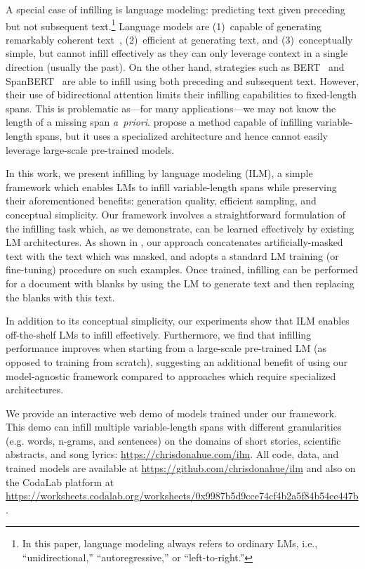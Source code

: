 A special case of infilling is language modeling: 
predicting text given preceding but not subsequent text.\footnote{In this paper, language modeling always refers to ordinary LMs, i.e., ``unidirectional,'' ``autoregressive,'' or ``left-to-right.''}
Language models are 
(1)~capable of generating remarkably coherent text~\citep{zellers2019defending,see2019massively},
(2)~efficient at generating text, 
and 
(3)~conceptually simple, 
but cannot infill effectively as they can only leverage context in a single direction (usually the past).
On the other hand, 
strategies such as BERT~\citep{devlin2019bert} and SpanBERT~\citep{joshi2019spanbert} are able to infill using both preceding and subsequent text. 
However, their use of bidirectional attention limits their infilling capabilities to fixed-length spans. 
This is problematic as---for many applications---we may not know the length of a missing span \emph{a~priori}. 
\citet{zhu2019text} propose a method capable of infilling variable-length spans, but it uses a specialized architecture and hence cannot easily leverage large-scale pre-trained models.

In this work, 
we present infilling by language modeling (ILM), 
a simple framework which enables LMs to infill variable-length spans while preserving their aforementioned benefits:
generation quality, efficient sampling, and conceptual simplicity. 
Our framework involves a straightforward formulation of the infilling task which, as we demonstrate, can be learned effectively by existing LM architectures. 
As shown in ,
our approach concatenates artificially-masked text with the text which was masked, and adopts a standard LM training (or fine-tuning) procedure on such examples. 
Once trained, infilling can be performed for a document with blanks by using the LM to generate text and then replacing the blanks with this text.

In addition to its conceptual simplicity, 
our experiments show that ILM enables off-the-shelf LMs to infill effectively. 
Furthermore, we find that infilling performance improves when starting from a large-scale pre-trained LM (as opposed to training from scratch), 
suggesting an additional benefit of using our model-agnostic framework compared to approaches which require specialized architectures.

We provide an interactive web demo of models trained under our framework. 
This demo can infill multiple variable-length spans with different granularities (e.g. words, n-grams, and sentences) on the domains of short stories, scientific abstracts, and song lyrics: 
\url{https://chrisdonahue.com/ilm}.
All code, data, and trained models are available at 
\url{https://github.com/chrisdonahue/ilm} and also on the CodaLab platform at  \url{https://worksheets.codalab.org/worksheets/0x9987b5d9cce74cf4b2a5f84b54ee447b}.